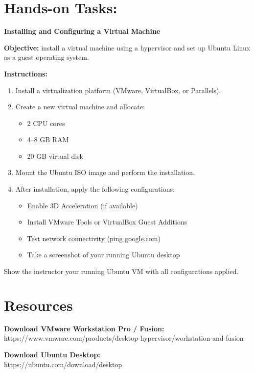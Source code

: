\section{Hands-on Tasks:}
\textbf{Installing and Configuring a Virtual Machine}

\textbf{Objective:} install a virtual machine using a hypervisor and set up Ubuntu Linux as a guest operating system.

\textbf{Instructions:}

\begin{enumerate}

    \item Install a virtualization platform (VMware, VirtualBox, or Parallels).

    \item Create a new virtual machine and allocate:
    \begin{itemize}
        \item 2 CPU cores
        \item 4–8 GB RAM
        \item 20 GB virtual disk
    \end{itemize}

    \item Mount the Ubuntu ISO image and perform the installation.

    \item After installation, apply the following configurations:
    \begin{itemize}
        \item Enable 3D Acceleration (if available)
        \item Install VMware Tools or VirtualBox Guest Additions
        \item Test network connectivity (ping google.com)
        \item Take a screenshot of your running Ubuntu desktop
    \end{itemize}
\end{enumerate}
Show the instructor your running Ubuntu VM with all configurations applied.

\section*{Resources}

\textbf{Download VMware Workstation Pro / Fusion:}\\
https://www.vmware.com/products/desktop-hypervisor/workstation-and-fusion

\textbf{Download Ubuntu Desktop:}\\
https://ubuntu.com/download/desktop

\newpage